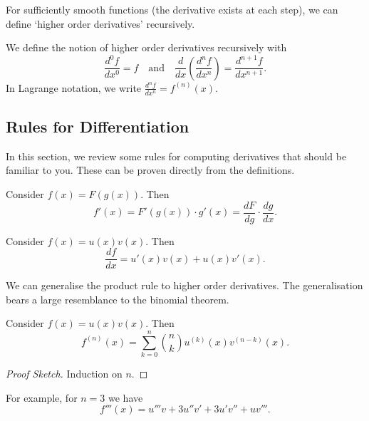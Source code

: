 \documentclass[a4]{scrartcl}
\begin{document}
For sufficiently smooth functions (the derivative exists at each step), we can define `higher order derivatives' recursively.

\begin{definition}
	We define the notion of higher order derivatives recursively with
	$$
	\frac{d^0 f}{dx^0} = f \quad \text{and} \quad \frac{d}{dx} \left(\frac{d^n f}{dx^n}\right) = \frac{d^{n + 1} f}{dx^{n + 1}}.
	$$
	In Lagrange notation, we write $\frac{d^n f}{dx^n} = f^{(n)}(x)$.
\end{definition}

\subsection{Rules for Differentiation}

In this section, we review some rules for computing derivatives that should be familiar to you. These can be proven directly from the definitions.

\begin{theorem}
	Consider $f(x) = F(g(x))$. Then
	$$
	f'(x) = F'(g(x)) \cdot g'(x) = \frac{dF}{dg} \cdot \frac{dg}{dx}.
	$$
\end{theorem}

\begin{theorem}
	Consider $f(x) = u(x) v(x)$. Then
	$$
	\frac{df}{dx} = u'(x) v(x) + u(x) v'(x).
	$$
\end{theorem}

We can generalise the product rule to higher order derivatives. The generalisation bears a large resemblance to the binomial theorem.

\begin{theorem}
	Consider $f(x) = u(x) v(x)$. Then
	$$
f^{(n)}(x) = \sum_{k = 0}^{n} \binom{n}{k} u^{(k)}(x) v^{(n - k)} (x).
	$$
\end{theorem}
\begin{proof}[Proof Sketch]
	Induction on $n$.
\end{proof}

For example, for $n = 3$ we have
$$
f'''(x) = u'''v + 3 u'' v' + 3 u' v'' + u v'''.
$$


\end{document}
